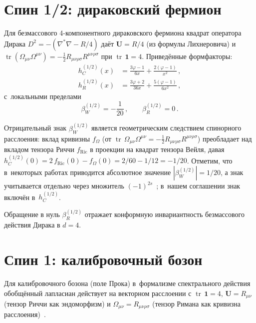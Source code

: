 \documentclass[12pt,a4paper]{article}
\newcommand{\Riemsq}{R_{\mu\nu\rho\sigma}R^{\mu\nu\rho\sigma}}
\newcommand{\tr}{\operatorname{tr}}
\begin{document}
\section{Спин 1/2: дираковский фермион}
\label{sec:dirac}

Для безмассового 4-компонентного дираковского фермиона квадрат оператора Дирака
$D^2 = -(\nabla^*\nabla - R/4)$ даёт $\mathbf{U} = R/4$
(из формулы Лихнеровича) и
$\tr(\Omega_{\mu\nu}\Omega^{\mu\nu}) = -\frac{1}{2}\Riemsq$ при
$\tr\,\mathbf{1} = 4$. Приведённые формфакторы:
\begin{subequations}
\label{eq:dirac-ff}
\begin{align}
  h_C^{(1/2)}(x) &= \frac{3\varphi - 1}{6x}
    + \frac{2(\varphi - 1)}{x^2}\,,
  \label{eq:hC12}\\
  h_R^{(1/2)}(x) &= \frac{3\varphi + 2}{36x}
    + \frac{5(\varphi - 1)}{6x^2}\,,
  \label{eq:hR12}
\end{align}
\end{subequations}
с~локальными пределами
\begin{equation}
  \beta_W^{(1/2)} = -\frac{1}{20}\,,\qquad
  \beta_R^{(1/2)} = 0\,.
  \label{eq:beta-dirac}
\end{equation}

Отрицательный знак $\beta_W^{(1/2)}$ является геометрическим следствием
спинорного расслоения: вклад кривизны $f_\Omega$ (от
$\tr\,\Omega_{\mu\nu}\Omega^{\mu\nu} = -\frac{1}{2}\Riemsq$) преобладает
над вкладом тензора Риччи $f_{\text{Ric}}$ в проекции на квадрат тензора Вейля,
давая $h_C^{(1/2)}(0) = 2\,f_{\text{Ric}}(0) - f_\Omega(0) = 2/60 - 1/12 = -1/20$.
Отметим, что в~некоторых работах приводится абсолютное значение
$|\beta_W^{(1/2)}| = 1/20$, а знак учитывается отдельно через множитель
$(-1)^{2s}$~\cite{Codello:2008vh}; в~нашем соглашении знак включён
в~$h_C^{(1/2)}$.

Обращение в нуль $\beta_R^{(1/2)}$ отражает конформную инвариантность
безмассового действия Дирака в $d = 4$.


\section{Спин 1: калибровочный бозон}
\label{sec:vector}

Для калибровочного бозона (поле Прока) в~формализме спектрального действия
обобщённый лапласиан действует на векторном расслоении с $\tr\,\mathbf{1} = 4$,
$\mathbf{U} = R_{\mu\nu}$ (тензор Риччи как эндоморфизм) и
$\Omega_{\mu\nu} = R_{\mu\nu\rho\sigma}$ (тензор Римана как кривизна
расслоения)~\cite{Parker:2009uva,Vassilevich:2003xt}.
\end{document}
